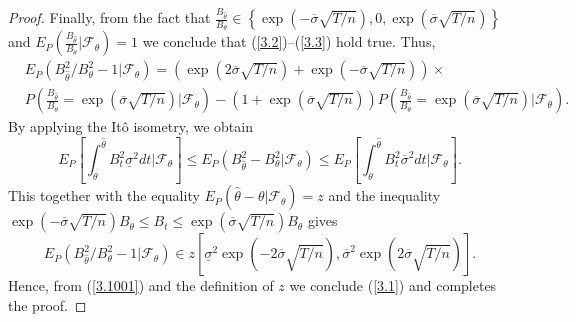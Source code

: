 \documentclass{amsart}
\numberwithin{equation}{section}
\begin{document}
\begin{proof}
Finally, from the fact that
$\frac{B_{\hat\theta}}{B_{\theta}}\in \left
\{\exp(-\overline{\sigma}\sqrt{T/n}),0,\exp(\overline{\sigma}\sqrt{T/n})
\right\}$ and
$E_{P}\left(\frac{B_{\hat\theta}}{B_{\theta}}|\mathcal F_{\theta}\right)=1$
we conclude that (\ref{3.2})--(\ref{3.3}) hold true. Thus,
\begin{eqnarray}\label{3.1001}
&E_{P}\left(B^2_{\hat\theta}/B^2_{\theta}-1|\mathcal F_{\theta}\right)=
\left(\exp(2\overline{\sigma}\sqrt{T/n})+\exp(-\overline{\sigma}\sqrt{T/n})\right)\times\\
&P\left(\frac{B_{\hat\theta}}{ B_{\theta}}=\exp(\overline{\sigma}\sqrt{T/n})|\mathcal F_{\theta}\right)-
\left(1+\exp(\overline{\sigma}\sqrt{T/n})\right)P\left(\frac{B_{\hat\theta}}{B_{\theta}}=\exp(\overline{\sigma}\sqrt{T/n})|\mathcal F_{\theta}\right).\nonumber
\end{eqnarray}
By applying the It\^{o} isometry,
we obtain
$$ E_P\left[\int_{\theta}^{\hat\theta} B^2_t\underline{\sigma}^2 dt|\mathcal F_{\theta}\right]\leq E_{P}\left(B^2_{\hat\theta}-B^2_{\theta}|\mathcal F_{\theta}\right)\leq E_P\left[\int_{\theta}^{\hat\theta} B^2_t\overline{\sigma}^2 dt|\mathcal F_{\theta}\right].$$
This together with the equality
$E_{P}(\hat\theta-\theta|\mathcal F_{\theta})=z$
and the inequality $\exp(-\overline{\sigma}\sqrt{T/n}) B_{\theta}\leq B_t\leq \exp(\overline{\sigma}\sqrt{T/n})B_{\theta}$ gives
 $$E_{P}\left(B^2_{\hat\theta}/B^2_{\theta}-1|\mathcal F_{\theta}\right)\in z[\underline{\sigma}^{2}\exp(-2\overline{\sigma}\sqrt{T/n}),\overline{\sigma}^{2}\exp(2\overline{\sigma}\sqrt{T/n})].$$
 Hence, from (\ref{3.1001}) and the definition of $z$ we
conclude (\ref{3.1}) and completes the proof.
\end{proof}
\end{document}
